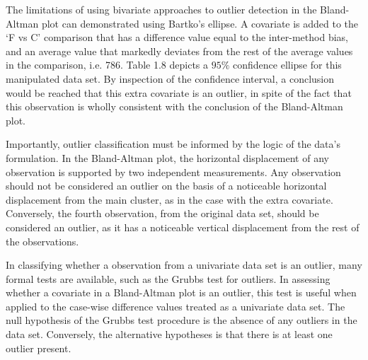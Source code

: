 \documentclass[12pt, a4paper]{report}
\theoremstyle{plain}
\theoremstyle{definition}
\theoremstyle{remark}
\begin{document}
	
	
	The limitations of using bivariate approaches to outlier detection
	in the Bland-Altman plot can demonstrated using Bartko's ellipse.
	A covariate is added to the `F vs C' comparison that has a
	difference value equal to the inter-method bias, and an average
	value that markedly deviates from the rest of the average values
	in the comparison, i.e. 786. Table 1.8 depicts a $95\%$ confidence
	ellipse for this manipulated data set. By inspection of the
	confidence interval, a conclusion would be reached that this extra
	covariate is an outlier, in spite of the fact that this
	observation is wholly consistent with the conclusion of the
	Bland-Altman plot.
	
	
	
	Importantly, outlier classification must be informed by the logic of the
	data's formulation. In the Bland-Altman plot, the horizontal displacement of any
	observation is supported by two independent measurements. Any
	observation should not be considered an outlier on the basis of a
	noticeable horizontal displacement from the main cluster, as in
	the case with the extra covariate. Conversely, the fourth
	observation, from the original data set, should be considered an
	outlier, as it has a noticeable vertical displacement from the
	rest of the observations.
	
	
	
	In classifying whether a observation from a univariate data set is
	an outlier, many formal tests are available, such as the Grubbs test for outliers. In assessing
	whether a covariate in a Bland-Altman plot is an outlier, this
	test is useful when applied to the case-wise difference values treated as a
	univariate data set. The null hypothesis of the Grubbs test procedure is the absence
	of any outliers in the data set. Conversely, the alternative hypotheses is that there is at least one outlier
	present.
	
\end{document}
